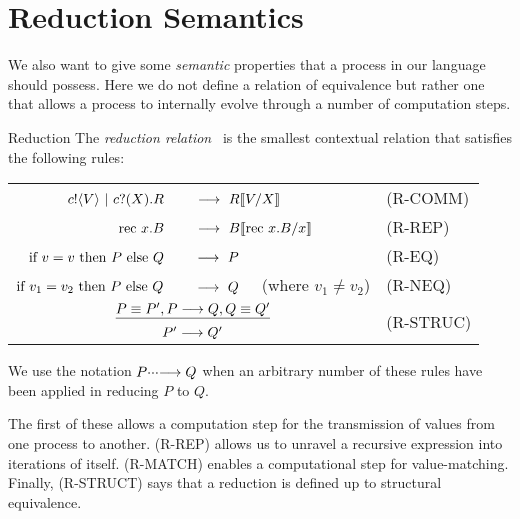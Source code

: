 \section{Reduction Semantics}\label{secreducationsemantics}
We also want to give some \emph{semantic} properties that a process in our language should possess.  Here we do not define a relation of equivalence but rather one that allows a process to internally evolve through a number of computation steps.
\begin{definition}{Reduction}
	The \emph{reduction relation} \pred\ is the smallest contextual relation that satisfies the following rules:
	\begin{center}\begin{tabular}{rll}
		${c}!\langle{V}\rangle \ |\  {c}?({X}).R$\ &\  $\longrightarrow\  R\llbracket{V}/{X}\rrbracket$ & \tiny{(R-COMM)}\\
		$\text{rec }{x}.B$\ &\  $\longrightarrow\  B\llbracket{ \ensuremath{\text{rec }{x}.} B}/{x}\rrbracket$ & \tiny{(R-REP)}\\
		$\text{if } {v = v}\text{ then } P \text{ else } Q$\ &\ $\pred\ P$ & \tiny{(R-EQ)}\\
		$\text{if } {v_1 = v_2}\text{ then } P \text{ else } Q$\ &\ $\pred\ Q$ \ \ (where $v_1\neq v_2$)& \tiny{(R-NEQ)}\\
		\multicolumn{2}{c}{\hspace{4.5em}$\underline{P\equiv P', P \longrightarrow Q, Q\equiv Q'}$} & \multirow{2}{*}{\tiny{(R-STRUC)}}\\
		\multicolumn{2}{c}{\hspace{4.5em}$P'\longrightarrow Q'$}
	\end{tabular}\end{center}
	We use the notation $P\cdotp\!\cdotp\!\cdotp\!\longrightarrow Q$ when an arbitrary number of these rules have been applied in reducing $P$ to $Q$.
\end{definition}
The first of these allows a computation step for the transmission of values from one process to another.  (R-REP)  allows us to unravel a recursive expression into iterations of itself.  (R-MATCH) enables a computational step for value-matching.  Finally, (R-STRUCT) says that a reduction is defined up to structural equivalence.
